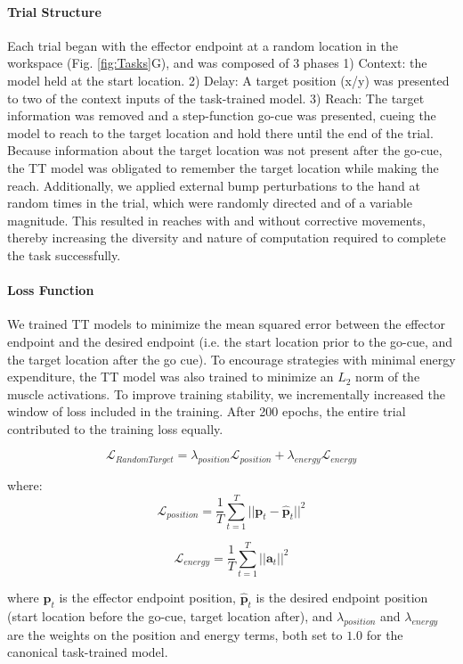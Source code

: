 \documentclass{article}
\begin{document}
\paragraph{Trial Structure}
Each trial began with the effector endpoint at a random location in the workspace (Fig. \ref{fig:Tasks}G), and was composed of 3 phases 1) Context: the model held at the start location. 2) Delay: A target position (x/y) was presented to two of the context inputs of the task-trained model. 3) Reach: The target information was removed and a step-function go-cue was presented, cueing the model to reach to the target location and hold there until the end of the trial. Because information about the target location was not present after the go-cue, the TT model was obligated to remember the target location while making the reach. Additionally, we applied external bump perturbations to the hand at random times in the trial, which were randomly directed and of a variable magnitude. This resulted in reaches with and without corrective movements, thereby increasing the diversity and nature of computation required to complete the task successfully.

\paragraph{Loss Function}
We trained TT models to minimize the mean squared error between the effector endpoint and the desired endpoint (i.e. the start location prior to the go-cue, and the target location after the go cue). To encourage strategies with minimal energy expenditure, the TT model was also trained to minimize an $L_2$ norm of the muscle activations. To improve training stability, we incrementally increased the window of loss included in the training. After 200 epochs, the entire trial contributed to the training loss equally.

$$\mathcal{L}_{RandomTarget} = \lambda_{position} \mathcal{L}_{position} + \lambda_{energy} \mathcal{L}_{energy}$$

where:
$$\mathcal{L}_{position} = \frac{1}{T} \sum_{t=1}^{T} ||\mathbf{p}_t - \mathbf{\hat{p}}_t||^2$$

$$\mathcal{L}_{energy} = \frac{1}{T} \sum_{t=1}^{T} ||\mathbf{a}_t||^2$$

where $\mathbf{p}_t$ is the effector endpoint position, $\mathbf{\hat{p}}_t$ is the desired endpoint position (start location before the go-cue, target location after), and $\lambda_{position}$ and $\lambda_{energy}$ are the weights on the position and energy terms, both set to $1.0$ for the canonical task-trained model.
\end{document}
